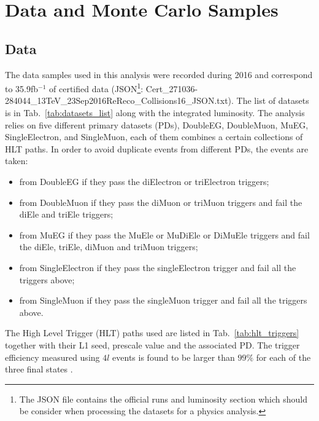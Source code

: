 

\chapter{Data and Monte Carlo Samples}
\label{sec:datasets}
\section{Data}
The data samples used in this analysis were recorded during 2016 and correspond to 35.9fb$^{-1}$ of certified data (JSON\footnote{The JSON file contains the official runs and luminosity section which should be consider when processing the datasets for a physics analysis.}: {\footnotesize Cert\_271036-284044\_13TeV\_23Sep2016ReReco\_Collisions16\_JSON.txt}).
The list of datasets is in Tab.~\ref{tab:datasets_list} along with the integrated luminosity. The analysis relies on five different primary datasets (PDs), DoubleEG, DoubleMuon, MuEG, SingleElectron, and SingleMuon, each of them combines a certain collections of HLT paths. In order to avoid duplicate events from different PDs, the events are taken:

\begin{itemize}
	\item from DoubleEG if they pass the diElectron or triElectron triggers;
	\item from DoubleMuon if they pass the diMuon or triMuon triggers and fail the diEle and triEle triggers;
	\item from MuEG if they pass the MuEle or MuDiEle or DiMuEle triggers and fail the diEle, triEle, diMuon and triMuon triggers;
	\item from SingleElectron if they pass the singleElectron trigger and fail all the triggers above;
	\item from SingleMuon if they pass the singleMuon trigger and fail all the triggers above.
\end{itemize}

The High Level Trigger (HLT) paths used are listed in Tab.~\ref{tab:hlt_triggers} together with their L1 seed, prescale value and the associated PD. The trigger efficiency measured using $4l$ events is found to be larger than $99\%$ for each of the three final states \cite{bib:CMS-AN-16-328}. 

